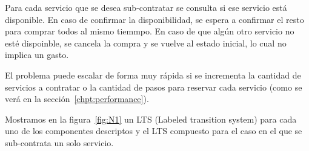 Para cada servicio que se desea sub-contratar se consulta si ese servicio está disponible. En caso de confirmar la disponibilidad, se espera a confirmar el resto para comprar todos al  mismo tiemmpo. En caso de que algún otro servicio no esté dispoinble, se cancela la compra y se vuelve al estado inicial, lo cual no implica un gasto.

El problema puede escalar de forma muy rápida si se incrementa la cantidad de servicios a contratar o la cantidad de pasos para reservar cada servicio (como se verá en la sección~\ref{chpt:performance}).

Mostramos en la figura~\ref{fig:N1} un LTS (Labeled transition system) para cada uno de los componentes descriptos y el LTS compuesto para el caso en el que se sub-contrata un solo servicio.

\begin{figure}[htb]
	\begin{center}
\end{center}
\end{figure}
